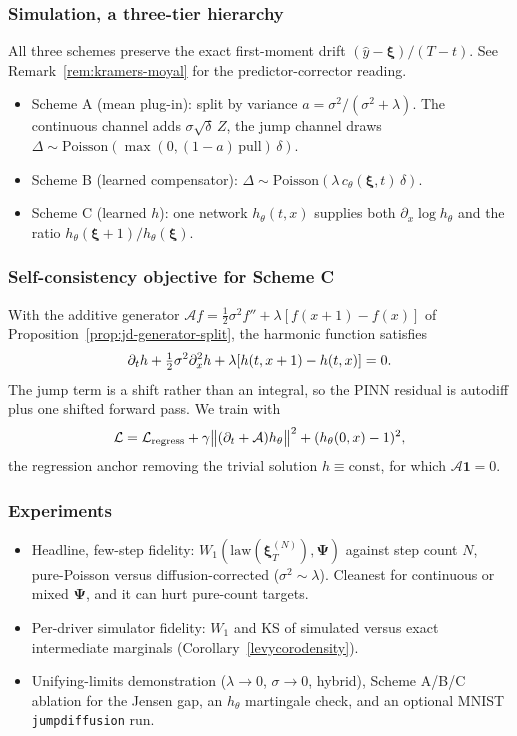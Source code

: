 \documentclass{article}
\def\xib{\boldsymbol{\xi}}
\theoremstyle{definition}
\begin{document}
\subsubsection*{Simulation, a three-tier hierarchy}
All three schemes preserve the exact first-moment drift $(\hat y-\xib)/(T-t)$. See
Remark~\ref{rem:kramers-moyal} for the predictor-corrector reading.
\begin{itemize}
  \item Scheme A (mean plug-in): split by variance $a=\sigma^2/(\sigma^2+\lambda)$. The continuous channel adds $\sigma\sqrt\delta\,Z$, the jump channel draws $\Delta\sim\mathrm{Poisson}(\max(0,(1-a)\,\text{pull})\,\delta)$.
  \item Scheme B (learned compensator): $\Delta\sim\mathrm{Poisson}(\lambda\,c_\theta(\xib,t)\,\delta)$.
  \item Scheme C (learned $h$): one network $h_\theta(t,x)$ supplies both $\partial_x\log h_\theta$ and the ratio $h_\theta(\xib+1)/h_\theta(\xib)$.
\end{itemize}

\subsubsection*{Self-consistency objective for Scheme C}
With the additive generator $\mathcal A f=\tfrac12\sigma^2 f''+\lambda[f(x+1)-f(x)]$ of
Proposition~\ref{prop:jd-generator-split}, the harmonic function satisfies
\begin{align}
\partial_t h+\tfrac12\sigma^2\partial_x^2 h+\lambda[h(t,x+1)-h(t,x)]=0. \notag
\end{align}
The jump term is a shift rather than an integral, so the PINN residual is autodiff plus one shifted
forward pass. We train with
\begin{align}
\mathcal L=\mathcal L_{\text{regress}}+\gamma\big\|(\partial_t+\mathcal A)h_\theta\big\|^2+(h_\theta(0,x)-1)^2, \notag
\end{align}
the regression anchor removing the trivial solution $h\equiv\text{const}$, for which $\mathcal A\mathbf 1=0$.

\subsubsection*{Experiments}
\begin{itemize}
  \item Headline, few-step fidelity: $W_1(\mathrm{law}(\xib_T^{(N)}),\boldsymbol{\Psi})$ against step count $N$, pure-Poisson versus diffusion-corrected ($\sigma^2\sim\lambda$). Cleanest for continuous or mixed $\boldsymbol{\Psi}$, and it can hurt pure-count targets.
  \item Per-driver simulator fidelity: $W_1$ and KS of simulated versus exact intermediate marginals (Corollary~\ref{levycorodensity}).
  \item Unifying-limits demonstration ($\lambda\to0$, $\sigma\to0$, hybrid), Scheme A/B/C ablation for the Jensen gap, an $h_\theta$ martingale check, and an optional MNIST \texttt{jumpdiffusion} run.
\end{itemize}
\end{document}
